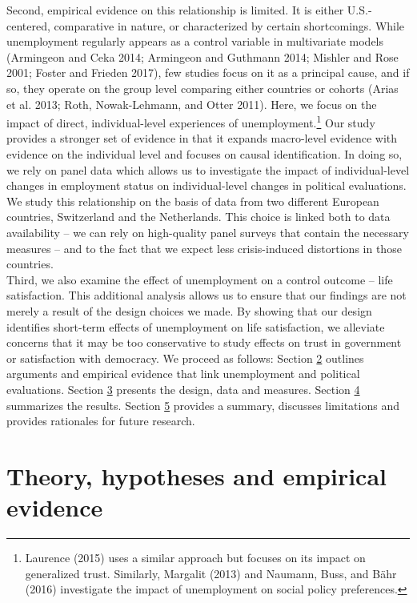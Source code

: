 \documentclass[12pt,]{article}
\let\rmarkdownfootnote\footnote%
\def\footnote{\protect\rmarkdownfootnote}
\begin{document}
Second, empirical evidence on this relationship is limited. It is either U.S.-centered, comparative in nature, or characterized by certain shortcomings. While unemployment regularly appears as a control variable in multivariate models (Armingeon and Ceka 2014; Armingeon and Guthmann 2014; Mishler and Rose 2001; Foster and Frieden 2017), few studies focus on it as a principal cause, and if so, they operate on the group level comparing either countries or cohorts (Arias et al. 2013; Roth, Nowak-Lehmann, and Otter 2011). Here, we focus on the impact of direct, individual-level experiences of unemployment.\footnote{Laurence (2015) uses a similar approach but focuses on its impact on generalized trust. Similarly, Margalit (2013) and Naumann, Buss, and Bähr (2016) investigate the impact of unemployment on social policy preferences.} Our study provides a stronger set of evidence in that it expands macro-level evidence with evidence on the individual level and focuses on causal identification. In doing so, we rely on panel data which allows us to investigate the impact of individual-level changes in employment status on individual-level changes in political evaluations. We study this relationship on the basis of data from two different European countries, Switzerland and the Netherlands. This choice is linked both to data availability -- we can rely on high-quality panel surveys that contain the necessary measures -- and to the fact that we expect less crisis-induced distortions in those countries.\\
Third, we also examine the effect of unemployment on a control outcome -- life satisfaction. This additional analysis allows us to ensure that our findings are not merely a result of the design choices we made. By showing that our design identifies short-term effects of unemployment on life satisfaction, we alleviate concerns that it may be too conservative to study effects on trust in government or satisfaction with democracy.
We proceed as follows: Section \protect\hyperlink{sec:theory}{2} outlines arguments and empirical evidence that link unemployment and political evaluations. Section \protect\hyperlink{sec:data}{3} presents the design, data and measures. Section \protect\hyperlink{sec:results}{4} summarizes the results. Section \protect\hyperlink{sec:conclusion}{5} provides a summary, discusses limitations and provides rationales for future research.

\hypertarget{sec:theory}{%
\section{Theory, hypotheses and empirical evidence}\label{sec:theory}}
\end{document}

